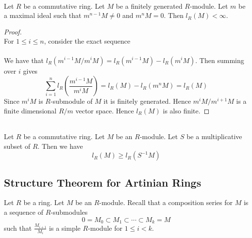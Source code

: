 \documentclass[a4paper]{article}
\begin{document}
\begin{lmm}{}{}\\
Let $R$ be a commutative ring. Let $M$ be a finitely generated $R$-module. Let $m$ be a maximal ideal such that $m^{n-1}M\neq 0$ and $m^nM=0$. Then $l_R(M)<\infty$. 
\begin{proof}\\
For $1\leq i\leq n$, consider the exact sequence \\
\\
We have that $l_R(m^{i-1}M/m^iM)=l_R(m^{i-1}M)-l_R(m^iM)$. Then summing over $i$ gives $$\sum_{i=1}^nl_R\left(\frac{m^{i-1}M}{m^iM}\right)=l_R(M)-l_R(m^nM)=l_R(M)$$ Since $m^iM$ is $R$-submodule of $M$ it is finitely generated. Hence $m^iM/m^{i+1}M$ is a finite dimensional $R/m$ vector space. Hence $l_R(M)$ is also finite. 
\end{proof}
\end{lmm}

\begin{lmm}{}{}\\
Let $R$ be a commutative ring. Let $M$ be an $R$-module. Let $S$ be a multiplicative subset of $R$. Then we have $$l_R(M)\geq l_R(S^{-1}M)$$
\end{lmm}

\subsection{Structure Theorem for Artinian Rings}
Let $R$ be a ring. Let $M$ be an $R$-module. Recall that a composition series for $M$ is a sequence of $R$-submodules $$0=M_0\subset M_1\subset\cdots\subset M_k=M$$ such that $\frac{M_{i+1}}{M_i}$ is a simple $R$-module for $1\leq i<k$. 
\end{document}
